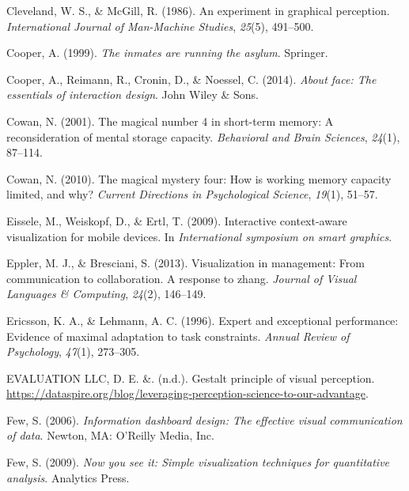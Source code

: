 \documentclass[print]{nuthesis}
\newlength{\cslhangindent}
\newenvironment{CSLReferences}[2]%
{\setlength{\parindent}{0pt}%
\everypar{\setlength{\hangindent}{\cslhangindent}}\ignorespaces}%
{\par}
\begin{document}
\begin{CSLReferences}{1}{0}
\leavevmode{}%
Cleveland, W. S., \& McGill, R. (1986). An experiment in graphical perception. \emph{International Journal of Man-Machine Studies}, \emph{25}(5), 491--500.

\leavevmode{}%
Cooper, A. (1999). \emph{The inmates are running the asylum}. Springer.

\leavevmode{}%
Cooper, A., Reimann, R., Cronin, D., \& Noessel, C. (2014). \emph{About face: The essentials of interaction design}. John Wiley \& Sons.

\leavevmode{}%
Cowan, N. (2001). The magical number 4 in short-term memory: A reconsideration of mental storage capacity. \emph{Behavioral and Brain Sciences}, \emph{24}(1), 87--114.

\leavevmode{}%
Cowan, N. (2010). The magical mystery four: How is working memory capacity limited, and why? \emph{Current Directions in Psychological Science}, \emph{19}(1), 51--57.

\leavevmode{}%
Eissele, M., Weiskopf, D., \& Ertl, T. (2009). Interactive context-aware visualization for mobile devices. In \emph{International symposium on smart graphics}.

\leavevmode{}%
Eppler, M. J., \& Bresciani, S. (2013). Visualization in management: From communication to collaboration. A response to zhang. \emph{Journal of Visual Languages \& Computing}, \emph{24}(2), 146--149.

\leavevmode{}%
Ericsson, K. A., \& Lehmann, A. C. (1996). Expert and exceptional performance: Evidence of maximal adaptation to task constraints. \emph{Annual Review of Psychology}, \emph{47}(1), 273--305.

\leavevmode{}%
EVALUATION LLC, D. E. \&. (n.d.). Gestalt principle of visual perception. \url{https://dataspire.org/blog/leveraging-perception-science-to-our-advantage}.

\leavevmode{}%
Few, S. (2006). \emph{Information dashboard design: The effective visual communication of data}. Newton, MA: O'Reilly Media, Inc.

\leavevmode{}%
Few, S. (2009). \emph{Now you see it: Simple visualization techniques for quantitative analysis}. Analytics Press.


\end{CSLReferences}
\end{document}
